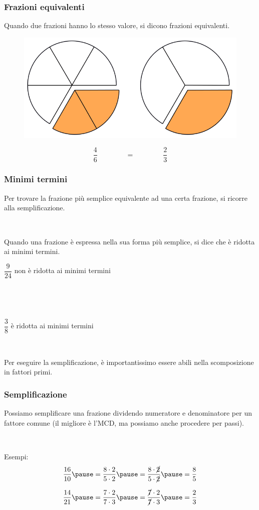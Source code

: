 \documentclass[]{beamer}
\theoremstyle{plain}
\begin{document}
\begin{frame}
\frametitle{Frazioni equivalenti}
Quando due frazioni hanno lo stesso valore, si dicono \alert{frazioni equivalenti}.
\begin{figure}
  \includegraphics[width=.62\columnwidth]{img/frazquivalenti.png}
\end{figure}
\[ \frac{4}{6}\qquad\qquad=\qquad\qquad\frac{2}{3}\]
\end{frame}


\begin{frame}
\frametitle{Minimi termini}
Per trovare la frazione \alert{più semplice} equivalente ad una certa frazione, si ricorre alla \alert{semplificazione}.\pause

~

Quando una frazione è espressa nella sua forma più semplice, si dice che è \alert{ridotta ai minimi termini}.

\begin{center}
  $ \dfrac{9}{24} $ \alert{non} è ridotta ai minimi termini


  ~

  ~

  $ \dfrac{3}{8} $ è ridotta ai minimi termini
\end{center}\pause

~

Per eseguire la semplificazione, è importantissimo essere abili nella \alert{scomposizione in fattori primi}.
\end{frame}

\begin{frame}
\frametitle{Semplificazione}
Possiamo semplificare una frazione \alert{dividendo numeratore e denominatore} per un fattore comune (il migliore è l'MCD, ma possiamo anche procedere per passi).\pause

~

Esempi:
\[ \frac{16}{10}\pause = \frac{8 \cdot 2}{5 \cdot 2}\pause = \frac{8 \cdot \cancel{2}}{5 \cdot \cancel{2}}\pause = \frac{8}{5} \]\pause

\[ \frac{14}{21}\pause = \frac{7 \cdot 2}{7 \cdot 3}\pause = \frac{\cancel{7}\cdot 2}{\cancel{7} \cdot 3}\pause = \frac{2}{3} \]
\end{frame}
\end{document}
